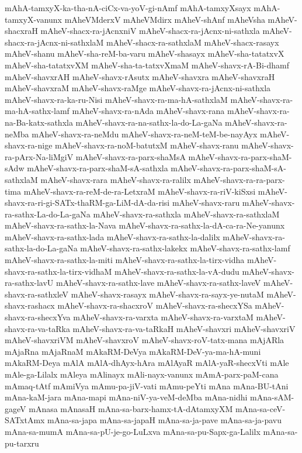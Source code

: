 {mAhA-tamxyX-ka-tha-nA-ciCx-va-yoV-gi-nAmf
mAhA-tamxyXsayx
mAhA-tamxyX-vanunx
mAheVMderxV
mAheVMdirx
mAheV-shAnf
mAheVsha
mAheV-shacxraH
mAheV-shacx-ra-jAcnxniV
mAheV-shacx-ra-jAcnx-ni-sathxla
mAheV-shacx-ra-jAcnx-ni-sathxlaM
mAheV-shacx-ra-sathxlaM
mAheV-shacx-rasayx
mAheV-shanu
mAheV-sha-reM-ba-varu
mAheV-shasayx
mAheV-sha-tatatxvX
mAheV-sha-tatatxvXM
mAheV-sha-ta-tatxvXmaM
mAheV-shavx-rA-Bi-dhamf
mAheV-shavxrAH
mAheV-shavx-rAsutx
mAheV-shavxra
mAheV-shavxraH
mAheV-shavxraM
mAheV-shavx-raMge
mAheV-shavx-ra-jAcnx-ni-sathxla
mAheV-shavx-ra-ka-ru-Nisi
mAheV-shavx-ra-ma-hA-sathxlaM
mAheV-shavx-ra-ma-hA-sathx-lamf
mAheV-shavx-ra-nAda
mAheV-shavx-rana
mAheV-shavx-ra-na-Ba-katx-sathxla
mAheV-shavx-ra-na-sathx-la-do-La-gaNa
mAheV-shavx-ra-neMba
mAheV-shavx-ra-neMdu
mAheV-shavx-ra-neM-teM-be-nayAyx
mAheV-shavx-ra-nige
mAheV-shavx-ra-noM-batutxM
mAheV-shavx-ranu
mAheV-shavx-ra-pArx-Na-liMgiV
mAheV-shavx-ra-parx-shaMsA
mAheV-shavx-ra-parx-shaM-sAdw
mAheV-shavx-ra-parx-shaM-sA-sathxla
mAheV-shavx-ra-parx-shaM-sA-sathxlaM
mAheV-shavx-rara
mAheV-shavx-ra-ralilx
mAheV-shavx-ra-ra-parx-tima
mAheV-shavx-ra-reM-de-ra-LetxraM
mAheV-shavx-ra-riV-kiSxsi
mAheV-shavx-ra-ri-gi-SATx-thaRM-ga-LiM-dA-da-risi
mAheV-shavx-raru
mAheV-shavx-ra-sathx-La-do-La-gaNa
mAheV-shavx-ra-sathxla
mAheV-shavx-ra-sathxlaM
mAheV-shavx-ra-sathx-la-Nava
mAheV-shavx-ra-sathx-la-dA-ca-ra-Ne-yanunx
mAheV-shavx-ra-sathx-lada
mAheV-shavx-ra-sathx-la-dalilx
mAheV-shavx-ra-sathx-la-do-La-gaNa
mAheV-shavx-ra-sathx-lakekx
mAheV-shavx-ra-sathx-lamf
mAheV-shavx-ra-sathx-la-miti
mAheV-shavx-ra-sathx-la-tirx-vidha
mAheV-shavx-ra-sathx-la-tirx-vidhaM
mAheV-shavx-ra-sathx-la-vA-dudu
mAheV-shavx-ra-sathx-lavU
mAheV-shavx-ra-sathx-lave
mAheV-shavx-ra-sathx-laveV
mAheV-shavx-ra-sathxleV
mAheV-shavx-rasayx
mAheV-shavx-ra-sayx-ye-nutaM
mAheV-shavx-rashacx
mAheV-shavx-ra-shacxroV
mAheV-shavx-ra-shecxYSa
mAheV-shavx-ra-shecxYva
mAheV-shavx-ra-varxta
mAheV-shavx-ra-varxtaM
mAheV-shavx-ra-va-taRka
mAheV-shavx-ra-va-taRkaH
mAheV-shavxri
mAheV-shavxriV
mAheV-shavxriVM
mAheV-shavxroV
mAheV-shavx-roV-tatx-mana
mAjARla
mAjaRna
mAjaRnaM
mAkaRM-DeVya
mAkaRM-DeV-ya-ma-hA-muni
mAkaRM-Deya
mAlA
mAlA-dhAyx-hAra
mAlAyaR
mAlA-yaR-shecxVti
mAle
mAle-ga-Lilalx
mAleya
mAlinayx
mAli-nayx-vanunx
mAmA-parx-paM-cana
mAmaq-tAtf
mAmiVya
mAmu-pa-jiV-vati
mAmu-peYti
mAna
mAna-BU-tAni
mAna-kaM-jara
mAna-mapi
mAna-niV-ya-veM-deMba
mAna-nidhi
mAna-sAM-gageV
mAnasa
mAnasaH
mAna-sa-barx-hamx-tA-dAtamxyXM
mAna-sa-ceV-SATxtAmx
mAna-sa-japa
mAna-sa-japaH
mAna-sa-ja-pave
mAna-sa-ja-pavu
mAna-sa-mumA
mAna-sa-pU-je-go-LuLxva
mAna-sa-pu-Sapx-ga-Lalilx
mAna-sa-pu-tarxru
}
